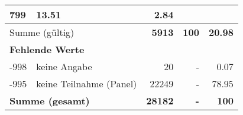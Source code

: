 \begin{longtable}{lXrrr}
       \num{799} &
       \num[round-mode=places,round-precision=2]{13,51} &
         \num[round-mode=places,round-precision=2]{2,84} \\
     \midrule
     \multicolumn{2}{l}{Summe (gültig)} &
       \textbf{\num{5913}} &
     \textbf{100} &
       \textbf{\num[round-mode=places,round-precision=2]{20,98}} \\
     \multicolumn{5}{l}{\textbf{Fehlende Werte}}\\
       -998 &
       keine Angabe &
         \num{20} &
        - &
         \num[round-mode=places,round-precision=2]{0,07} \\
       -995 &
       keine Teilnahme (Panel) &
         \num{22249} &
        - &
         \num[round-mode=places,round-precision=2]{78,95} \\
     \midrule
     \multicolumn{2}{l}{\textbf{Summe (gesamt)}} &
          \textbf{\num{28182}} &
        \textbf{-} &
        \textbf{100} \\
     \bottomrule
     \end{longtable}
     
